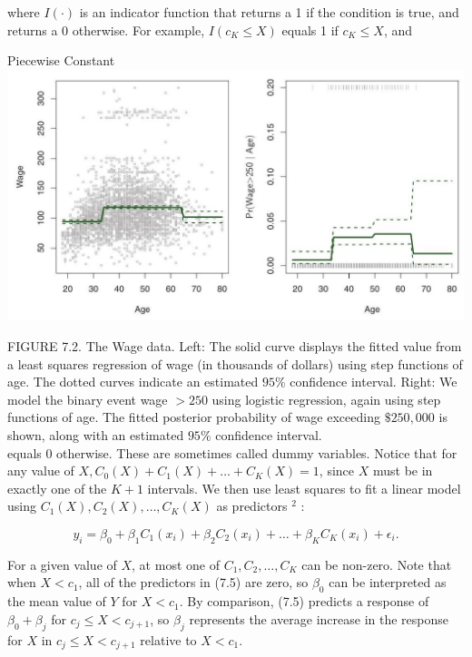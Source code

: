 \documentclass[10pt]{article}
\begin{document}
where $I(\cdot)$ is an indicator function that returns a 1 if the condition is true, and returns a 0 otherwise. For example, $I\left(c_{K} \leq X\right)$ equals 1 if $c_{K} \leq X$, and

Piecewise Constant\\
\includegraphics[max width=\textwidth, center]{2025_05_05_efe77898333945044de4g-284}

FIGURE 7.2. The Wage data. Left: The solid curve displays the fitted value from a least squares regression of wage (in thousands of dollars) using step functions of age. The dotted curves indicate an estimated $95 \%$ confidence interval. Right: We model the binary event wage $>250$ using logistic regression, again using step functions of age. The fitted posterior probability of wage exceeding $\$ 250,000$ is shown, along with an estimated $95 \%$ confidence interval.\\
equals 0 otherwise. These are sometimes called dummy variables. Notice that for any value of $X, C_{0}(X)+C_{1}(X)+\ldots+C_{K}(X)=1$, since $X$ must be in exactly one of the $K+1$ intervals. We then use least squares to fit a linear model using $C_{1}(X), C_{2}(X), \ldots, C_{K}(X)$ as predictors ${ }^{2}$ :


\begin{equation*}
y_{i}=\beta_{0}+\beta_{1} C_{1}\left(x_{i}\right)+\beta_{2} C_{2}\left(x_{i}\right)+\ldots+\beta_{K} C_{K}\left(x_{i}\right)+\epsilon_{i} . \tag{7.5}
\end{equation*}


For a given value of $X$, at most one of $C_{1}, C_{2}, \ldots, C_{K}$ can be non-zero. Note that when $X<c_{1}$, all of the predictors in (7.5) are zero, so $\beta_{0}$ can be interpreted as the mean value of $Y$ for $X<c_{1}$. By comparison, (7.5) predicts a response of $\beta_{0}+\beta_{j}$ for $c_{j} \leq X<c_{j+1}$, so $\beta_{j}$ represents the average increase in the response for $X$ in $c_{j} \leq X<c_{j+1}$ relative to $X<c_{1}$.
\end{document}
